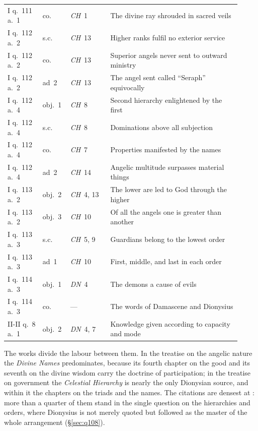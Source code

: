 {\begin{longtable}{@{}>{\raggedright\arraybackslash}p{0.14\linewidth}>{\raggedright\arraybackslash}p{0.10\linewidth}>{\raggedright\arraybackslash}p{0.16\linewidth}>{\raggedright\arraybackslash}p{0.52\linewidth}@{}}
I q.~111 a.~1 & co. & \emph{CH}~1 & The divine ray shrouded in sacred veils \\
I q.~112 a.~2 & s.c. & \emph{CH}~13 & Higher ranks fulfil no exterior service \\
I q.~112 a.~2 & co. & \emph{CH}~13 & Superior angels never sent to outward ministry \\
I q.~112 a.~2 & ad~2 & \emph{CH}~13 & The angel sent called ``Seraph'' equivocally \\
I q.~112 a.~4 & obj.~1 & \emph{CH}~8 & Second hierarchy enlightened by the first \\
I q.~112 a.~4 & s.c. & \emph{CH}~8 & Dominations above all subjection \\
I q.~112 a.~4 & co. & \emph{CH}~7 & Properties manifested by the names \\
I q.~112 a.~4 & ad~2 & \emph{CH}~14 & Angelic multitude surpasses material things \\
I q.~113 a.~2 & obj.~2 & \emph{CH}~4, 13 & The lower are led to God through the higher \\
I q.~113 a.~2 & obj.~3 & \emph{CH}~10 & Of all the angels one is greater than another \\
I q.~113 a.~3 & s.c. & \emph{CH}~5, 9 & Guardians belong to the lowest order \\
I q.~113 a.~3 & ad~1 & \emph{CH}~10 & First, middle, and last in each order \\
I q.~114 a.~3 & obj.~1 & \emph{DN}~4 & The demons a cause of evils \\
I q.~114 a.~3 & co. & --- & The words of Damascene and Dionysius \\
II-II q.~8 a.~1 & obj.~2 & \emph{DN}~4, 7 & Knowledge given according to capacity and mode \\
\end{longtable}}

The works divide the labour between them. In the treatise on the
angelic nature the \emph{Divine Names} predominates, because its fourth chapter on the
good and its seventh on the divine wisdom carry the doctrine of
participation; in the treatise on government the \emph{Celestial
Hierarchy} is nearly the only Dionysian source, and within it the
chapters on the triads and the names. The citations are densest at
: more than a quarter of them stand in the single question
on the hierarchies and orders, where Dionysius is not
merely quoted but followed as the master of the whole arrangement
(\S\ref{sec:q108}).
